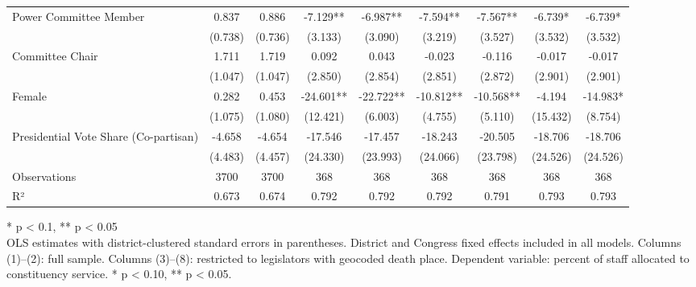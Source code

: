 \begin{table}[t]
\begin{tabular*}{\linewidth}{@{\extracolsep{\fill}}lcccccccc}
Power Committee Member & 0.837 & 0.886 & -7.129** & -6.987** & -7.594** & -7.567** & -6.739* & -6.739* \\ 
 & (0.738) & (0.736) & (3.133) & (3.090) & (3.219) & (3.527) & (3.532) & (3.532) \\ 
Committee Chair & 1.711 & 1.719 & 0.092 & 0.043 & -0.023 & -0.116 & -0.017 & -0.017 \\ 
 & (1.047) & (1.047) & (2.850) & (2.854) & (2.851) & (2.872) & (2.901) & (2.901) \\ 
Female & 0.282 & 0.453 & -24.601** & -22.722** & -10.812** & -10.568** & -4.194 & -14.983* \\ 
 & (1.075) & (1.080) & (12.421) & (6.003) & (4.755) & (5.110) & (15.432) & (8.754) \\ 
Presidential Vote Share (Co-partisan) & -4.658 & -4.654 & -17.546 & -17.457 & -18.243 & -20.505 & -18.706 & -18.706 \\ 
{} & {(4.483)} & {(4.457)} & {(24.330)} & {(23.993)} & {(24.066)} & {(23.798)} & {(24.526)} & {(24.526)} \\ 
Observations & 3700 & 3700 & 368 & 368 & 368 & 368 & 368 & 368 \\ 
R² & 0.673 & 0.674 & 0.792 & 0.792 & 0.792 & 0.791 & 0.793 & 0.793 \\ 
\bottomrule
\end{tabular*}
\begin{minipage}{\linewidth}
\vspace{.05em}
* p < 0.1, ** p < 0.05\\
OLS estimates with district-clustered standard errors in parentheses. District and Congress fixed effects included in all models. Columns (1)–(2): full sample. Columns (3)–(8): restricted to legislators with geocoded death place. Dependent variable: percent of staff allocated to constituency service. * p < 0.10, ** p < 0.05.\\
\end{minipage}
\end{table}

